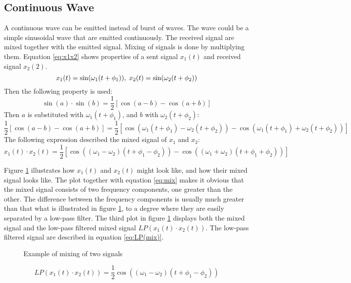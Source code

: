 \subsection{Continuous Wave}
A continuous wave can be emitted instead of burst of waves. The wave could be a simple sinusoidal wave that are emitted continuously. The received signal are mixed together with the emitted signal. Mixing of signals is done by multiplying them. Equation \ref{eq:x1x2} shows properties of a sent signal $x_1(t)$ and received signal $x_2(2)$.
\begin{equation} \label{eq:x1x2}
    x_1(t) = \sin(\omega_{1}(t + \phi_{1})), \hspace{1mm} x_2(t) = \sin(\omega_{2}(t + \phi_{2}))
\end{equation}
Then the following property is used:
\begin{equation} \label{eq:sin*sin}
    \sin(a) \cdot \sin(b) = \frac{1}{2}[\cos(a - b) - \cos(a + b)]
\end{equation}
Then $a$ is substituted with $\omega_{1}(t + \phi_{1})$, and $b$ with $\omega_{2}(t + \phi_{2})$:
\begin{equation} \label{eq:sin*sin}
    \frac{1}{2}[\cos(a - b) - \cos(a + b)] = \frac{1}{2}[\cos(\omega_{1}(t + \phi_{1}) - \omega_{2}(t + \phi_{2})) - \cos(\omega_{1}(t + \phi_{1}) + \omega_{2}(t + \phi_{2}))]
\end{equation}
The following expression described the mixed signal of $x_1$ and $x_2$:
\begin{equation} \label{eq:mix}
    x_1(t) \cdot x_2(t) = \frac{1}{2}[\cos((\omega_{1} - \omega_{2})(t + \phi_{1}-\phi_{2})) - \cos((\omega_{1} + \omega_{2})(t + \phi_{1} + \phi_{2}))]
\end{equation}

Figure \ref{fig:mix} illustrates how $x_1(t)$ and $x_2(t)$ might look like, and how their mixed signal looks like. The plot together with equation \ref{eq:mix} makes it obvious that the mixed signal consists of two frequency components, one greater than the other. The difference between the frequency components is usually much greater than that what is illustrated in figure \ref{fig:mix}, to a degree where they are easily separated by a low-pass filter. The third plot in figure \ref{fig:mix} displays both the mixed signal and the low-pass filtered mixed signal $LP(x_1(t) \cdot x_2(t))$. The low-pass filtered signal are described in equation \ref{eq:LP(mix)}.   

\begin{figure}[H]
\centering

  \caption{Example of mixing of two signals}
  \label{fig:mix}
\end{figure}
\begin{equation} \label{eq:LP(mix)}
    LP(x_1(t) \cdot x_2(t)) = \frac{1}{2} 
 \cos((\omega_{1} - \omega_{2})(t + \phi_{1}-\phi_{2}))
\end{equation}

